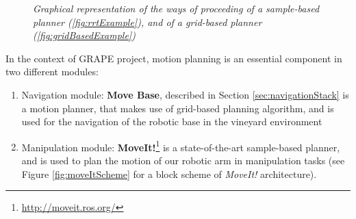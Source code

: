 \begin{figure}
	\centering
	\caption{\textit{Graphical representation of the ways of proceeding of a sample-based planner (\ref{fig:rrtExample}), and of a grid-based planner (\ref{fig:gridBasedExample})}}
	\label{fig:planningExamples}
\end{figure}

In the context of \ac{GRAPE} project, motion planning is an essential component in two different modules:
\begin{enumerate}
	\item Navigation module: \textbf{Move Base}, described in Section \ref{sec:navigationStack} is a motion planner, that makes use of grid-based planning algorithm, and is used for the navigation of the robotic base in the vineyard environment
	\item Manipulation module: \textbf{MoveIt!}\footnote{\url{http://moveit.ros.org/}}
is a state-of-the-art sample-based planner, and is used to plan the motion of our robotic arm in manipulation tasks (see Figure \ref{fig:moveItScheme} for a block scheme of \textit{MoveIt!} architecture).
\end{enumerate}


